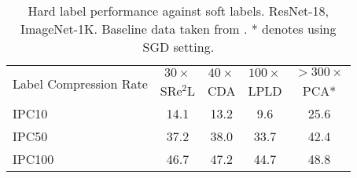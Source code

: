 \begin{table}[t]
\centering
\scriptsize
\caption{Hard label performance against soft labels. ResNet-18, ImageNet-1K. Baseline data taken from \citeauthor{xiao2024large}. * denotes using SGD setting.}
\label{tab:compare-soft}
\begin{tabular}{@{}lcccc@{}}
\toprule
\multirow{2}{*}{Label Compression Rate}     & $30\times$ & $40\times$  & $100\times$ & $> 300\times$ \\
       & SRe$^2$L                   & CDA  & LPLD                     & \multicolumn{1}{c}{PCA*}   \\ \midrule
IPC10  & 14.1                    & 13.2 & 9.6                      & 25.6                      \\
IPC50  & 37.2                    & 38.0 & 33.7                     & 42.4                      \\
IPC100 & 46.7                    & 47.2 & 44.7                     & 48.8                      \\ \bottomrule
\end{tabular}
\end{table}